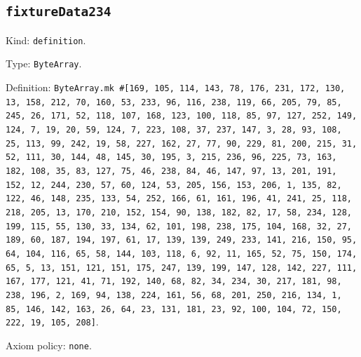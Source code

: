 \documentclass[11pt]{article}
\begin{document}
\subsection*{\texttt{fixtureData234}}
\noindent Kind: \texttt{definition}.\par
\noindent Type: \texttt{ByteArray}.\par
\noindent Definition: \texttt{ByteArray.mk \#[169, 105, 114, 143, 78, 176, 231, 172, 130, 13, 158, 212, 70, 160, 53, 233, 96, 116, 238, 119, 66, 205, 79, 85, 245, 26, 171, 52, 118, 107, 168, 123, 100, 118, 85, 97, 127, 252, 149, 124, 7, 19, 20, 59, 124, 7, 223, 108, 37, 237, 147, 3, 28, 93, 108, 25, 113, 99, 242, 19, 58, 227, 162, 27, 77, 90, 229, 81, 200, 215, 31, 52, 111, 30, 144, 48, 145, 30, 195, 3, 215, 236, 96, 225, 73, 163, 182, 108, 35, 83, 127, 75, 46, 238, 84, 46, 147, 97, 13, 201, 191, 152, 12, 244, 230, 57, 60, 124, 53, 205, 156, 153, 206, 1, 135, 82, 122, 46, 148, 235, 133, 54, 252, 166, 61, 161, 196, 41, 241, 25, 118, 218, 205, 13, 170, 210, 152, 154, 90, 138, 182, 82, 17, 58, 234, 128, 199, 115, 55, 130, 33, 134, 62, 101, 198, 238, 175, 104, 168, 32, 27, 189, 60, 187, 194, 197, 61, 17, 139, 139, 249, 233, 141, 216, 150, 95, 64, 104, 116, 65, 58, 144, 103, 118, 6, 92, 11, 165, 52, 75, 150, 174, 65, 5, 13, 151, 121, 151, 175, 247, 139, 199, 147, 128, 142, 227, 111, 167, 177, 121, 41, 71, 192, 140, 68, 82, 34, 234, 30, 217, 181, 98, 238, 196, 2, 169, 94, 138, 224, 161, 56, 68, 201, 250, 216, 134, 1, 85, 146, 142, 163, 26, 64, 23, 131, 181, 23, 92, 100, 104, 72, 150, 222, 19, 105, 208]}.\par
\noindent Axiom policy: \texttt{none}.\par
\end{document}
